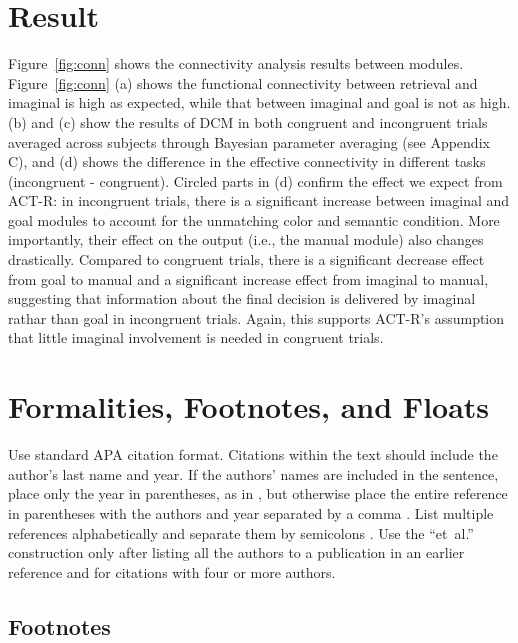 \documentclass[10pt,letterpaper]{article}
\begin{document}
\section{Result}

Figure~\ref{fig:conn} shows the connectivity analysis results between modules. Figure~\ref{fig:conn} (a) shows the functional connectivity between retrieval and imaginal is high as expected, while that between imaginal and goal is not as high. (b) and (c) show the results of DCM in both congruent and incongruent trials averaged across subjects through Bayesian parameter averaging \cite{Kasess2010} (see Appendix C), and (d) shows the difference in the effective connectivity in different tasks (incongruent - congruent). Circled parts in (d) confirm the effect we expect from ACT-R: in incongruent trials, there is a significant increase between imaginal and goal modules to account for the unmatching color and semantic condition. More importantly, their effect on the output (i.e., the manual module) also changes drastically. Compared to congruent trials, there is a significant decrease effect from goal to manual and a significant increase effect from imaginal to manual, suggesting that information about the final decision is delivered by imaginal rathar than goal in incongruent trials. Again, this supports ACT-R's assumption that little imaginal involvement is needed in congruent trials. 



\section{Formalities, Footnotes, and Floats}

Use standard APA citation format. Citations within the text should
include the author's last name and year. If the authors' names are
included in the sentence, place only the year in parentheses, as in
, but otherwise place the entire reference in
parentheses with the authors and year separated by a comma
\cite{NewellSimon1972a}. List multiple references alphabetically and
separate them by semicolons
\cite{ChalnickBillman1988a,NewellSimon1972a}. Use the
``et~al.'' construction only after listing all the authors to a
publication in an earlier reference and for citations with four or
more authors.


\subsection{Footnotes}
\end{document}
